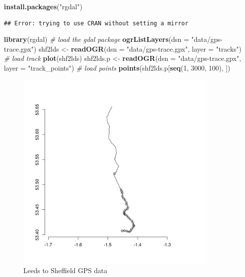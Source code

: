 \documentclass[]{article}
\newenvironment{Shaded}{}{}
\newcommand{\KeywordTok}[1]{\textcolor[rgb]{0.00,0.44,0.13}{\textbf{{#1}}}}
\newcommand{\DataTypeTok}[1]{\textcolor[rgb]{0.56,0.13,0.00}{{#1}}}
\newcommand{\DecValTok}[1]{\textcolor[rgb]{0.25,0.63,0.44}{{#1}}}
\newcommand{\StringTok}[1]{\textcolor[rgb]{0.25,0.44,0.63}{{#1}}}
\newcommand{\CommentTok}[1]{\textcolor[rgb]{0.38,0.63,0.69}{\textit{{#1}}}}
\newcommand{\NormalTok}[1]{{#1}}
\let\Oldincludegraphics\includegraphics
\renewcommand{\includegraphics}[1]{\Oldincludegraphics[width=10cm]{#1}}
\begin{document}
\begin{Shaded}
\begin{Highlighting}[]
\KeywordTok{install.packages}\NormalTok{(}\StringTok{"rgdal"}\NormalTok{)}
\end{Highlighting}
\end{Shaded}
\begin{verbatim}
## Error: trying to use CRAN without setting a mirror
\end{verbatim}
\begin{Shaded}
\begin{Highlighting}[]
\KeywordTok{library}\NormalTok{(rgdal)  }\CommentTok{# load the gdal package}
\KeywordTok{ogrListLayers}\NormalTok{(}\DataTypeTok{dsn =} \StringTok{"data/gps-trace.gpx"}\NormalTok{)}
\NormalTok{shf2lds <- }\KeywordTok{readOGR}\NormalTok{(}\DataTypeTok{dsn =} \StringTok{"data/gps-trace.gpx"}\NormalTok{, }\DataTypeTok{layer =} \StringTok{"tracks"}\NormalTok{)  }\CommentTok{# load track}
\KeywordTok{plot}\NormalTok{(shf2lds)}
\NormalTok{shf2lds.p <- }\KeywordTok{readOGR}\NormalTok{(}\DataTypeTok{dsn =} \StringTok{"data/gps-trace.gpx"}\NormalTok{, }\DataTypeTok{layer =} \StringTok{"track_points"}\NormalTok{)  }\CommentTok{# load points}
\KeywordTok{points}\NormalTok{(shf2lds.p[}\KeywordTok{seq}\NormalTok{(}\DecValTok{1}\NormalTok{, }\DecValTok{3000}\NormalTok{, }\DecValTok{100}\NormalTok{), ])}
\end{Highlighting}
\end{Shaded}
\begin{figure}[htbp]
\centering
\includegraphics{figure/Leeds_to_Sheffield_GPS_data.png}
\caption{Leeds to Sheffield GPS data}
\end{figure}
\end{document}
